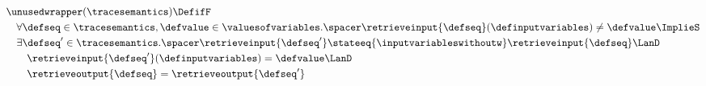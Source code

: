 \begin{align*}
  &\unusedwrapper(\tracesemantics) \DefifF \\
  &\quad\forall
    \defseq\in\tracesemantics, \defvalue\in\valuesofvariables
  .\spacer
    \retrieveinput{\defseq}(\definputvariables) \neq \defvalue \ImplieS \\
    &\quad\exists
      \defseq'\in\tracesemantics
    .\spacer
      \retrieveinput{\defseq'} \stateeq{\inputvariableswithoutw} \retrieveinput{\defseq}
      \LanD \\
    &\quad\quad
      \retrieveinput{\defseq'}(\definputvariables) = \defvalue
      \LanD \\
    &\quad\quad
      \retrieveoutput{\defseq} = \retrieveoutput{\defseq'}
\end{align*}
